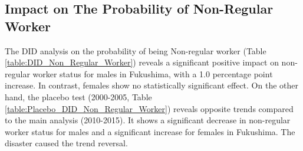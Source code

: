 \documentclass[a4paper,12pt]{article}
\begin{document}
\subsection{Impact on The Probability of Non-Regular Worker}


The DID analysis on the probability of being Non-regular worker (Table \ref{table:DID_Non_Regular_Worker}) reveals a significant positive impact on non-regular worker status for males in Fukushima, with a 1.0 percentage point increase. In contrast, females show no statistically significant effect. On the other hand, the placebo test (2000-2005, Table \ref{table:Placebo_DID_Non_Regular_Worker})  reveals opposite trends compared to the main analysis (2010-2015). It shows a significant decrease in non-regular worker status for males and a significant increase for females in Fukushima. The disaster caused the trend reversal.

\end{document}

